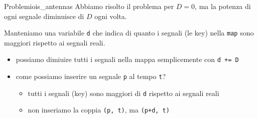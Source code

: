 \documentclass[compress]{beamer}
\begin{document}
\begin{frame}{}
\end{frame}

\begin{frame}{Problemi}{ois\_antennas}
    Abbiamo risolto il problema per $D = 0$, ma la potenza di ogni segnale diminuisce di $D$ ogni volta.

    \pause
    Manteniamo una variabile \texttt{d} che indica di quanto i segnali (le key) nella \texttt{map} sono maggiori rispetto ai segnali reali.
    \pause
    \begin{itemize}
        \item possiamo dimiuire tutti i segnali nella mappa semplicemente con \texttt{d += D}
        \item come possiamo inserire un segnale \texttt{p} al tempo \texttt{t}?
        \pause
        \begin{itemize}
            \pause
            \item tutti i segnali (key) sono maggiori di \texttt{d} rispetto ai segnali reali
            \pause
            \item non inseriamo la coppia \texttt{(p, t)}, ma \texttt{(p+d, t)}
        \end{itemize}
    \end{itemize}
\end{frame}
\end{document}
